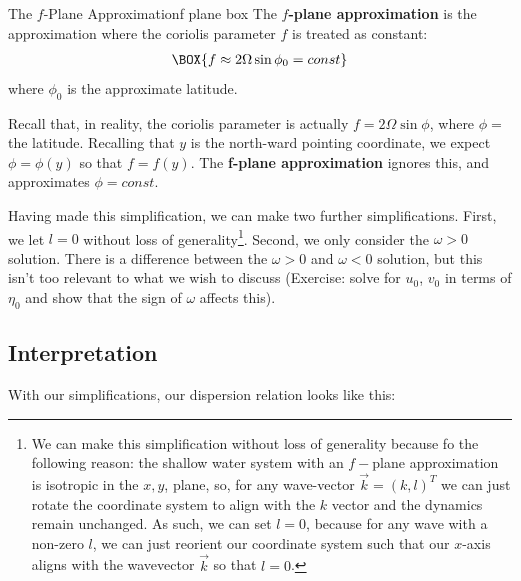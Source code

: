 \begin{fact}{The $f$-Plane Approximation}{f plane box}\label{f plane box}
    The \textbf{$f$-plane approximation} is the approximation where the coriolis parameter $f$ is treated as constant:
    \begin{align*}
        \BOX{f\approx2\Omega\sin\phi_0=const}
    \end{align*}
    where $\phi_0$ is the approximate latitude.
    
    Recall that, in reality, the coriolis parameter is actually $f=2\Omega \sin \phi$, where $\phi=$ the latitude. Recalling that $y$ is the north-ward pointing coordinate, we expect $\phi=\phi(y)$ so that $f=f(y)$. The \textbf{f-plane approximation} ignores this, and approximates $\phi=const$.
\end{fact}

Having made this simplification, we can make two further simplifications. First, we let $l=0$ without loss of generality\footnote{
    We can make this simplification without loss of generality because fo the following reason: the shallow water system with an $f-$plane approximation is isotropic in the $x,y$, plane, so, for any wave-vector $\vec{k}=(k,l)^T$ we can just rotate the coordinate system to align with the $k$ vector and the dynamics remain unchanged. As such, we can set $l=0$, because for any wave with a non-zero $l$, we can just reorient our coordinate system such that our $x$-axis aligns with the wavevector $\vec{k}$ so that $l=0$.
}. Second, we only consider the $\omega>0$ solution. There is a difference between the $\omega>0$ and $\omega<0$ solution, but this isn't too relevant to what we wish to discuss (Exercise: solve for $u_0$, $v_0$ in terms of $\eta_0$ and show that the sign of $\omega$ affects this).

\subsection{Interpretation}

With our simplifications, our dispersion relation looks like this:

